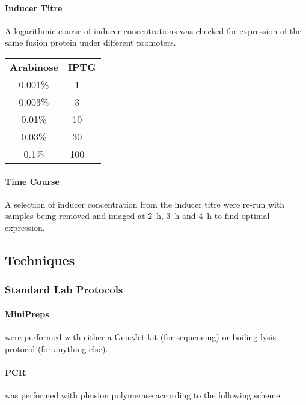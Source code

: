 \documentclass[../main.tex]{subfiles}
\begin{document}
\paragraph{Inducer Titre} A logarithmic course of inducer concentrations was checked for expression of the same fusion protein under different promoters.

\begin{center}
\begin{tabular}{cc}
\textbf{Arabinose}	&	\textbf{IPTG} 	\\
0.001\%	&	\SI{1}{\micro\Molar}\\
0.003\%	&	\SI{3}{\micro\Molar}\\
0.01\%	&	\SI{10}{\micro\Molar}\\
0.03\%	&	\SI{30}{\micro\Molar}\\
0.1\%	&	\SI{100}{\micro\Molar}\\

\end{tabular}
\end{center}

\paragraph{Time Course}	A selection of inducer concentration from the inducer titre were re-run with samples being removed and imaged at \SI{2}{\hour}, \SI{3}{\hour} and \SI{4}{\hour} to find optimal expression.
  
\subsection{Techniques}

\subsubsection{Standard Lab Protocols}
\paragraph{MiniPreps} were performed with either a GeneJet kit (for sequencing) or boiling lysis protocol (for anything else).
\paragraph{PCR} was performed with phusion polymerase according to the following scheme:
\end{document}
